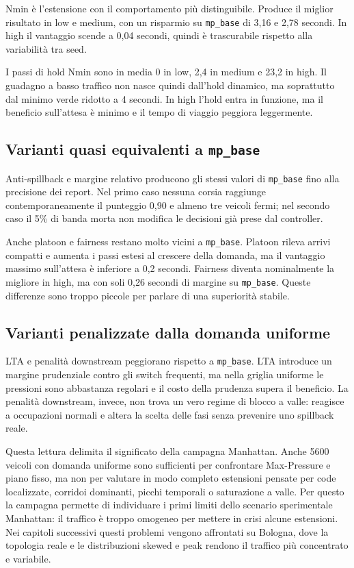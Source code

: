 \documentclass[12pt,a4paper,oneside]{report}
\numberwithin{equation}{chapter}
\begin{document}
Nmin è l'estensione con il comportamento più distinguibile. Produce il miglior
risultato in low e medium, con un risparmio su \texttt{mp\_base} di 3,16 e 2,78
secondi. In high il vantaggio scende a 0,04 secondi, quindi è trascurabile
rispetto alla variabilità tra seed.

I passi di hold Nmin sono in media 0 in low, 2,4 in medium e 23,2 in high. Il
guadagno a basso traffico non nasce quindi dall'hold dinamico, ma soprattutto
dal minimo verde ridotto a 4 secondi. In high l'hold entra in funzione, ma il
beneficio sull'attesa è minimo e il tempo di viaggio peggiora leggermente.

\subsection{Varianti quasi equivalenti a \texttt{mp\_base}}

Anti-spillback e margine relativo producono gli stessi valori di
\texttt{mp\_base} fino alla precisione dei report. Nel primo caso nessuna corsia
raggiunge contemporaneamente il punteggio 0,90 e almeno tre veicoli fermi; nel
secondo caso il 5\% di banda morta non modifica le decisioni già prese dal
controller.

Anche platoon e fairness restano molto vicini a \texttt{mp\_base}. Platoon rileva
arrivi compatti e aumenta i passi estesi al crescere della domanda, ma il
vantaggio massimo sull'attesa è inferiore a 0,2 secondi. Fairness diventa
nominalmente la migliore in high, ma con soli 0,26 secondi di margine su
\texttt{mp\_base}. Queste differenze sono troppo piccole per parlare di una
superiorità stabile.

\subsection{Varianti penalizzate dalla domanda uniforme}

LTA e penalità downstream peggiorano rispetto a \texttt{mp\_base}. LTA introduce
un margine prudenziale contro gli switch frequenti, ma nella griglia uniforme le
pressioni sono abbastanza regolari e il costo della prudenza supera il beneficio.
La penalità downstream, invece, non trova un vero regime di blocco a valle:
reagisce a occupazioni normali e altera la scelta delle fasi senza prevenire uno
spillback reale.

Questa lettura delimita il significato della campagna Manhattan. Anche 5600
veicoli con domanda uniforme sono sufficienti per confrontare Max-Pressure e
piano fisso, ma non per valutare in modo completo estensioni pensate per code
localizzate, corridoi dominanti, picchi temporali o saturazione a valle. Per
questo la campagna permette di individuare i primi limiti dello scenario
sperimentale Manhattan: il traffico è troppo omogeneo per mettere in crisi alcune
estensioni. Nei capitoli successivi questi problemi vengono affrontati su
Bologna, dove la topologia reale e le distribuzioni skewed e peak rendono il
traffico più concentrato e variabile.
\end{document}
